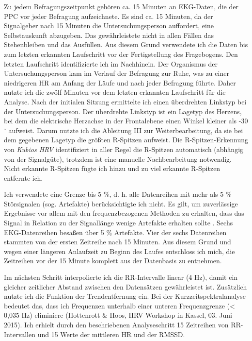 Zu jedem Befragungszeitpunkt gehören ca. 15 Minuten an \ac{EKG}-Daten, die der \ac{PPC} vor jeder Befragung aufzeichnete. Es sind ca. 15 Minuten, da der Signalgeber nach 15 Minuten die Untersuchungsperson auffordert, eine Selbstauskunft abzugeben. Das gewährleistete nicht in allen Fällen das Stehenbleiben und das Ausfüllen. Aus diesem Grund verwendete ich die Daten bis zum letzten erkannten Laufschritt vor der Fertigstellung des Fragebogens. Den letzten Laufschritt identifizierte ich im Nachhinein. Der Organismus der Untersuchungsperson kam im Verlauf der Befragung zur Ruhe, was zu einer niedrigeren \ac{HR} am Anfang der Läufe und nach jeder Befragung führte. Daher nutzte ich die zwölf Minuten vor dem letzten erkannten Laufschritt für die Analyse. Nach der initialen Sitzung ermittelte ich einen überdrehten Linkstyp bei der Untersuchungsperson. Der überdrehte Linkstyp ist ein Lagetyp des Herzens, bei dem die elektrische Herzachse in der Frontalebene einen Winkel kleiner als -30 $^{\circ}$ aufweist. Darum nutzte ich die Ableitung III zur Weiterbearbeitung, da sie bei dem gegebenen Lagetyp die größten R-Spitzen aufweist. Die R-Spitzen-Erkennung von \emph{Kubios HRV} identifiziert in aller Regel die R-Spitzen automatisch (abhängig von der Signalgüte), trotzdem ist eine manuelle Nachbearbeitung notwendig. Nicht erkannte R-Spitzen fügte ich hinzu und zu viel erkannte R-Spitzen entfernte ich.

Ich verwendete eine Grenze bis 5 \%, d. h. alle Datenreihen mit mehr als 5 \% Störsignalen (sog. Artefakte) berücksichtigte ich nicht. Es gilt, um zuverlässige Ergebnisse vor allem mit den frequenzbezogenen Methoden zu erhalten, dass das Signal in Relation zu der Signallänge wenige Artefakte erhalten sollte \citep[z.~B. < 5 - 10 \%; vgl. ][S.~77]{Sammito2015}. Sechs \ac{EKG}-Datenreihen besaßen über 5 \% Artefakte. Vier der sechs Datenreihen stammten von der ersten Zeitreihe nach 15 Minuten. Aus diesem Grund und wegen einer längeren Anlaufzeit zu Beginn des Laufes entschloss ich mich, die Zeitreihen vor der 15 Minute komplett aus der Datenbasis zu entnehmen.

Im nächsten Schritt interpolierte ich die RR-Intervalle linear (4 Hz), damit ein gleicher zeitlicher Abstand zwischen den Datensätzen gewährleistet ist. Zusätzlich nutzte ich die Funktion der Trendentfernung ein. Bei der Kurzzeitspektralanalyse bedeutet das, dass ich Frequenzen unterhalb einer unteren Frequenzgrenze (< 0,035 Hz) eliminiere (Hottenrott \& Hoos, \ac{HRV}-Workshop in Kassel, 03. Juni 2015). Ich erhielt durch den beschriebenen Analyseschritt 15 Zeitreihen von RR-Intervallen und 15 Werte der mittleren \ac{HR} und der \acs{RMSSD}.

